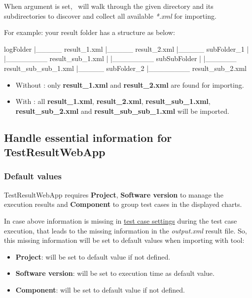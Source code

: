     When  argument is set, \pkg\ will walk through the given
    directory and its subdirectories to discover and collect all available
    \emph{*.xml} for importing.

    For example: your result folder has a structure as below:

\begin{robotlog}
logFolder
  |_____ result_1.xml
  |_____ result_2.xml
  |_____ subFolder_1
  |         |________ result_sub_1.xml
  |         |________ subSubFolder
  |                       |______ result_sub_sub_1.xml
  |_____ subFolder_2
            |________ result_sub_2.xml
\end{robotlog}

    \begin{itemize}
    \tightlist
    \item
      Without : only \textbf{result\_1.xml} and
      \textbf{result\_2.xml} are found for importing.
    \item
      With : all \textbf{result\_1.xml},
      \textbf{result\_2.xml}, \textbf{result\_sub\_1.xml},
      \textbf{result\_sub\_2.xml} and \textbf{result\_sub\_sub\_1.xml} will
      be imported.
    \end{itemize}

  \hypertarget{handle-required-information}{%
  \subsection{Handle essential information for TestResultWebApp}
  \label{handle-essential-information}}
    \subsubsection{Default values}
      TestResultWebApp requires \textbf{Project}, \textbf{Software version} to manage
      the execution results and \textbf{Component} to group test cases in the
      displayed charts.

      In case above information is missing in
      \hyperref[description-robotframework-testcase-settings]{test case settings}
      during the test case execution, that leads to the missing information in
      the \emph{output.xml} result file.
      So, this missing information will be set to default values when importing with
      \href{https://github.com/test-fullautomation/robotframework-robotlog2db}
      {\pkg} tool:
      \begin{itemize}
        \tightlist
        \item \textbf{Project}: will be set to default value 
              if not defined.

        \item \textbf{Software version}: will be set to execution time
               as default value.

        \item \textbf{Component}: will be set to default value 
              if not defined.
      \end{itemize}

